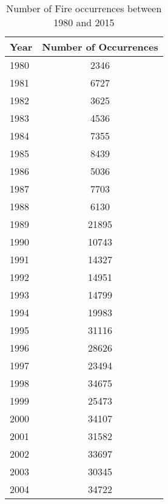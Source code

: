\begin{table}[H]
	\caption{Number of Fire occurrences between 1980 and 2015}
	\label{number_occurrences_1980_2013}
	\centering
	\begin{tabular}{lc}
		\hline
		Year & \multicolumn{1}{l}{Number of Occurrences} \\ \hline
		1980 & 2346                                      \\
		1981 & 6727                                      \\
		1982 & 3625                                      \\
		1983 & 4536                                      \\
		1984 & 7355                                      \\
		1985 & 8439                                      \\
		1986 & 5036                                      \\
		1987 & 7703                                      \\
		1988 & 6130                                      \\
		1989 & 21895                                     \\
		1990 & 10743                                     \\
		1991 & 14327                                     \\
		1992 & 14951                                     \\
		1993 & 14799                                     \\
		1994 & 19983                                     \\
		1995 & 31116                                     \\
		1996 & 28626                                     \\
		1997 & 23494                                     \\
		1998 & 34675                                     \\
		1999 & 25473                                     \\
		2000 & 34107                                     \\
		2001 & 31582                                     \\
		2002 & 33697                                     \\
		2003 & 30345                                     \\
		2004 & 34722                                     \\

\end{tabular}
\end{table}
